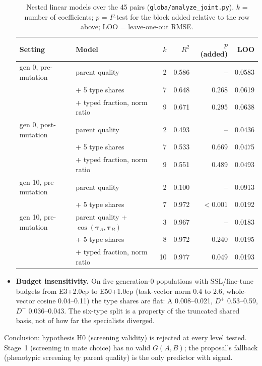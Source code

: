 \documentclass[11pt,a4paper]{article}
\newcommand{\tauv}{\boldsymbol{\tau}}
\newcommand{\Dp}{D^{+}}
\newcommand{\Dm}{D^{-}}
\newcommand{\code}[1]{\texttt{#1}}
\begin{document}
\begin{itemize}[nosep]
\begin{table}[h]
\centering\small
\caption{Nested linear models over the 45 pairs (\code{globa/analyze\_joint.py}). $k$ = number of coefficients; $p$ = $F$-test for the block added relative to the row above; LOO = leave-one-out RMSE.}
\label{tab:joint}
\begin{tabular}{llrrrr}
\toprule
Setting & Model & $k$ & $R^2$ & $p$ (added) & LOO \\
\midrule
gen 0, pre-mutation & parent quality & 2 & 0.586 & -- & 0.0583 \\
 & + 5 type shares & 7 & 0.648 & 0.268 & 0.0619 \\
 & + typed fraction, norm ratio & 9 & 0.671 & 0.295 & 0.0638 \\
\midrule
gen 0, post-mutation & parent quality & 2 & 0.493 & -- & 0.0436 \\
 & + 5 type shares & 7 & 0.533 & 0.669 & 0.0475 \\
 & + typed fraction, norm ratio & 9 & 0.551 & 0.489 & 0.0493 \\
\midrule
gen 10, pre-mutation & parent quality & 2 & 0.100 & -- & 0.0913 \\
 & + 5 type shares & 7 & 0.972 & $<0.001$ & 0.0192 \\
\midrule
gen 10, pre-mutation & parent quality + $\cos(\tauv_A,\tauv_B)$ & 3 & 0.967 & -- & 0.0183 \\
 & + 5 type shares & 8 & 0.972 & 0.240 & 0.0195 \\
 & + typed fraction, norm ratio & 10 & 0.977 & 0.049 & 0.0193 \\
\bottomrule
\end{tabular}
\end{table}
\item \textbf{Budget insensitivity.} On five generation-0 populations with SSL/fine-tune budgets from E3+2.0ep to E50+1.0ep (task-vector norm 0.4 to 2.6, whole-vector cosine 0.04--0.11) the type shares are flat: A 0.008--0.021, $\Dp$ 0.53--0.59, $\Dm$ 0.036--0.043. The six-type split is a property of the truncated shared basis, not of how far the specialists diverged.
\end{itemize}
Conclusion: hypothesis H0 (screening validity) is rejected at every level tested. Stage~1 (screening in mate choice) has no valid $G(A,B)$; the proposal's fallback (phenotypic screening by parent quality) is the only predictor with signal.
\end{document}
